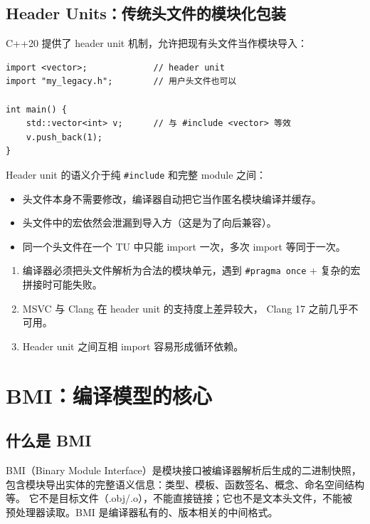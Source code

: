 \documentclass[12pt,a4paper,fontset=fandol]{ctexbook}
\newcommand{\cpplabel}{%
  \tcbox[on line,colback=cppheadbg,colframe=cppheadbg,
    boxrule=0pt,arc=1pt,left=2pt,right=2pt,top=1pt,bottom=1pt,
    colupper=white,fontupper=\scriptsize\bfseries]{C++}}
\newcommand{\flag}[1]{\texttt{#1}}
\begin{document}
\section{Header Units：传统头文件的模块化包装}

C++20 提供了 header unit 机制，允许把现有头文件当作模块导入：

\cpplabel
\begin{lstlisting}[style=cppstyle]
import <vector>;             // header unit
import "my_legacy.h";        // 用户头文件也可以

int main() {
    std::vector<int> v;      // 与 #include <vector> 等效
    v.push_back(1);
}
\end{lstlisting}

Header unit 的语义介于纯 \flag{\#include} 和完整 module 之间：

\begin{itemize}
  \item 头文件本身不需要修改，编译器自动把它当作匿名模块编译并缓存。
  \item 头文件中的宏依然会泄漏到导入方（这是为了向后兼容）。
  \item 同一个头文件在一个 TU 中只能 import 一次，多次 import 等同于一次。
\end{itemize}

\begin{warning}[title=Header Units 的局限]
\begin{enumerate}
  \item 编译器必须把头文件解析为合法的模块单元，遇到
        \flag{\#pragma once} + 复杂的宏拼接时可能失败。
  \item MSVC 与 Clang 在 header unit 的支持度上差异较大，
        Clang 17 之前几乎不可用。
  \item Header unit 之间互相 import 容易形成循环依赖。
\end{enumerate}
\end{warning}

\chapter{BMI：编译模型的核心}

\section{什么是 BMI}

BMI（Binary Module Interface）是模块接口被编译器解析后生成的二进制快照，
包含模块导出实体的完整语义信息：类型、模板、函数签名、概念、命名空间结构等。
它不是目标文件（.obj/.o），不能直接链接；它也不是文本头文件，不能被
预处理器读取。BMI 是编译器私有的、版本相关的中间格式。
\end{document}
